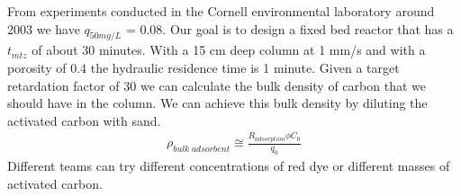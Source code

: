 \documentclass[letterpaper,10pt,english]{sphinxmanual}
\begin{document}
From experiments conducted in the Cornell environmental laboratory around 2003 we have  \(q_{50 mg/L}\) = 0.08. Our goal is to design a fixed bed reactor that has a \(t_{mtz}\) of about 30 minutes. With a 15 cm deep column at 1 mm/s and with a porosity of 0.4 the hydraulic residence time is 1 minute. Given a target retardation factor of 30 we can calculate the bulk density of carbon that we should have in the column. We can achieve this bulk density by diluting the activated carbon with sand.
\begin{equation}\label{equation:Adsorption/Adsorption:Adsorption/Adsorption:8}
\begin{split}\rho_{bulk \; adsorbent} \cong \frac{R_{adsorption}\phi C_0}{q_0}\end{split}
\end{equation}
Different teams can try different concentrations of red dye or different masses of activated carbon.
\end{document}
